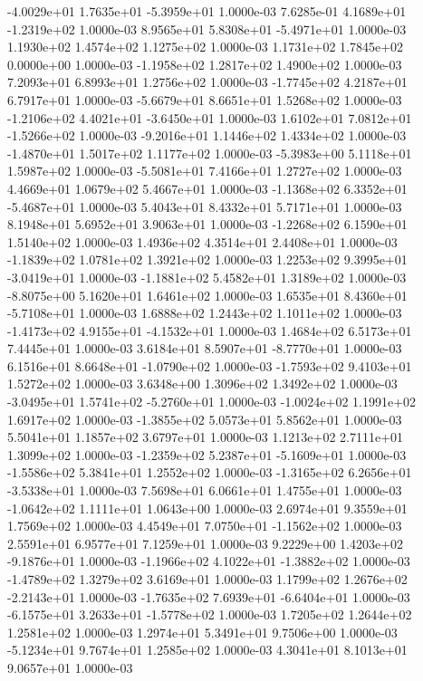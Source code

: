 -4.0029e+01  1.7635e+01 -5.3959e+01  1.0000e-03
 7.6285e-01  4.1689e+01 -1.2319e+02  1.0000e-03
 8.9565e+01  5.8308e+01 -5.4971e+01  1.0000e-03
1.1930e+02 1.4574e+02 1.1275e+02  1.0000e-03
1.1731e+02 1.7845e+02 0.0000e+00  1.0000e-03
-1.1958e+02  1.2817e+02  1.4900e+02  1.0000e-03
7.2093e+01 6.8993e+01 1.2756e+02  1.0000e-03
-1.7745e+02  4.2187e+01  6.7917e+01  1.0000e-03
-5.6679e+01  8.6651e+01  1.5268e+02  1.0000e-03
-1.2106e+02  4.4021e+01 -3.6450e+01  1.0000e-03
 1.6102e+01  7.0812e+01 -1.5266e+02  1.0000e-03
-9.2016e+01  1.1446e+02  1.4334e+02  1.0000e-03
-1.4870e+01  1.5017e+02  1.1177e+02  1.0000e-03
-5.3983e+00  5.1118e+01  1.5987e+02  1.0000e-03
-5.5081e+01  7.4166e+01  1.2727e+02  1.0000e-03
4.4669e+01 1.0679e+02 5.4667e+01  1.0000e-03
-1.1368e+02  6.3352e+01 -5.4687e+01  1.0000e-03
5.4043e+01 8.4332e+01 5.7171e+01  1.0000e-03
8.1948e+01 5.6952e+01 3.9063e+01  1.0000e-03
-1.2268e+02  6.1590e+01  1.5140e+02  1.0000e-03
1.4936e+02 4.3514e+01 2.4408e+01  1.0000e-03
-1.1839e+02  1.0781e+02  1.3921e+02  1.0000e-03
 1.2253e+02  9.3995e+01 -3.0419e+01  1.0000e-03
-1.1881e+02  5.4582e+01  1.3189e+02  1.0000e-03
-8.8075e+00  5.1620e+01  1.6461e+02  1.0000e-03
 1.6535e+01  8.4360e+01 -5.7108e+01  1.0000e-03
1.6888e+02 1.2443e+02 1.1011e+02  1.0000e-03
-1.4173e+02  4.9155e+01 -4.1532e+01  1.0000e-03
1.4684e+02 6.5173e+01 7.4445e+01  1.0000e-03
 3.6184e+01  8.5907e+01 -8.7770e+01  1.0000e-03
 6.1516e+01  8.6648e+01 -1.0790e+02  1.0000e-03
-1.7593e+02  9.4103e+01  1.5272e+02  1.0000e-03
3.6348e+00 1.3096e+02 1.3492e+02  1.0000e-03
-3.0495e+01  1.5741e+02 -5.2760e+01  1.0000e-03
-1.0024e+02  1.1991e+02  1.6917e+02  1.0000e-03
-1.3855e+02  5.0573e+01  5.8562e+01  1.0000e-03
5.5041e+01 1.1857e+02 3.6797e+01  1.0000e-03
1.1213e+02 2.7111e+01 1.3099e+02  1.0000e-03
-1.2359e+02  5.2387e+01 -5.1609e+01  1.0000e-03
-1.5586e+02  5.3841e+01  1.2552e+02  1.0000e-03
-1.3165e+02  6.2656e+01 -3.5338e+01  1.0000e-03
7.5698e+01 6.0661e+01 1.4755e+01  1.0000e-03
-1.0642e+02  1.1111e+01  1.0643e+00  1.0000e-03
2.6974e+01 9.3559e+01 1.7569e+02  1.0000e-03
 4.4549e+01  7.0750e+01 -1.1562e+02  1.0000e-03
2.5591e+01 6.9577e+01 7.1259e+01  1.0000e-03
 9.2229e+00  1.4203e+02 -9.1876e+01  1.0000e-03
-1.1966e+02  4.1022e+01 -1.3882e+02  1.0000e-03
-1.4789e+02  1.3279e+02  3.6169e+01  1.0000e-03
 1.1799e+02  1.2676e+02 -2.2143e+01  1.0000e-03
-1.7635e+02  7.6939e+01 -6.6404e+01  1.0000e-03
-6.1575e+01  3.2633e+01 -1.5778e+02  1.0000e-03
1.7205e+02 1.2644e+02 1.2581e+02  1.0000e-03
1.2974e+01 5.3491e+01 9.7506e+00  1.0000e-03
-5.1234e+01  9.7674e+01  1.2585e+02  1.0000e-03
4.3041e+01 8.1013e+01 9.0657e+01  1.0000e-03
